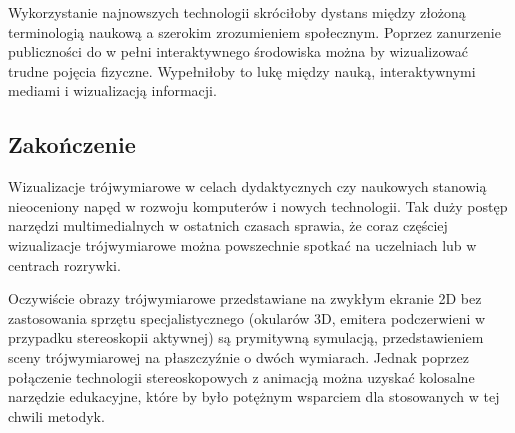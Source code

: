 Wykorzystanie najnowszych technologii skróciłoby dystans między złożoną terminologią naukową a szerokim zrozumieniem społecznym. Poprzez zanurzenie publiczności do w pełni interaktywnego środowiska można by wizualizować trudne pojęcia fizyczne. Wypełniłoby to lukę między nauką, interaktywnymi mediami i wizualizacją informacji.

\subsection{Zakończenie}
Wizualizacje trójwymiarowe w celach dydaktycznych czy naukowych stanowią nieoceniony napęd w rozwoju komputerów i nowych technologii.   Tak duży postęp narzędzi multimedialnych w ostatnich czasach sprawia, że coraz częściej wizualizacje trójwymiarowe można powszechnie spotkać na uczelniach lub w centrach rozrywki.

Oczywiście obrazy trójwymiarowe przedstawiane na zwykłym ekranie 2D bez zastosowania sprzętu specjalistycznego (okularów 3D, emitera podczerwieni w przypadku stereoskopii aktywnej) są prymitywną symulacją, przedstawieniem sceny trójwymiarowej na płaszczyźnie o dwóch wymiarach. Jednak poprzez połączenie technologii stereoskopowych z animacją można uzyskać kolosalne narzędzie edukacyjne, które by było potężnym wsparciem dla stosowanych w tej chwili metodyk. 

\newpage

\newpage
\listoffigures

\newpage
\listoftables

\newpage
\raggedbottom
\listofappendix

